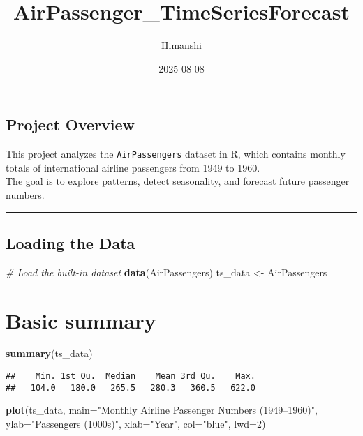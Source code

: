 \documentclass[
]{article}
\title{AirPassenger\_TimeSeriesForecast}
\author{Himanshi}
\date{2025-08-08}
\newenvironment{Shaded}{\begin{snugshade}}{\end{snugshade}}
\newcommand{\AttributeTok}[1]{\textcolor[rgb]{0.13,0.29,0.53}{#1}}
\newcommand{\CommentTok}[1]{\textcolor[rgb]{0.56,0.35,0.01}{\textit{#1}}}
\newcommand{\DecValTok}[1]{\textcolor[rgb]{0.00,0.00,0.81}{#1}}
\newcommand{\FunctionTok}[1]{\textcolor[rgb]{0.13,0.29,0.53}{\textbf{#1}}}
\newcommand{\NormalTok}[1]{#1}
\newcommand{\OtherTok}[1]{\textcolor[rgb]{0.56,0.35,0.01}{#1}}
\newcommand{\StringTok}[1]{\textcolor[rgb]{0.31,0.60,0.02}{#1}}
\begin{document}
\maketitle

\subsection{Project Overview}\label{project-overview}

This project analyzes the \texttt{AirPassengers} dataset in R, which
contains monthly totals of international airline passengers from 1949 to
1960.\\
The goal is to explore patterns, detect seasonality, and forecast future
passenger numbers.

\begin{center}\rule{0.5\linewidth}{0.5pt}\end{center}

\subsection{Loading the Data}\label{loading-the-data}

\begin{Shaded}
\begin{Highlighting}[]
\CommentTok{\# Load the built{-}in dataset}
\FunctionTok{data}\NormalTok{(AirPassengers)}
\NormalTok{ts\_data }\OtherTok{\textless{}{-}}\NormalTok{ AirPassengers}
\end{Highlighting}
\end{Shaded}

\section{Basic summary}\label{basic-summary}

\begin{Shaded}
\begin{Highlighting}[]
\FunctionTok{summary}\NormalTok{(ts\_data)}
\end{Highlighting}
\end{Shaded}

\begin{verbatim}
##    Min. 1st Qu.  Median    Mean 3rd Qu.    Max. 
##   104.0   180.0   265.5   280.3   360.5   622.0
\end{verbatim}

\begin{Shaded}
\begin{Highlighting}[]
\FunctionTok{plot}\NormalTok{(ts\_data,}
     \AttributeTok{main=}\StringTok{"Monthly Airline Passenger Numbers (1949–1960)"}\NormalTok{,}
     \AttributeTok{ylab=}\StringTok{"Passengers (1000s)"}\NormalTok{,}
     \AttributeTok{xlab=}\StringTok{"Year"}\NormalTok{,}
     \AttributeTok{col=}\StringTok{"blue"}\NormalTok{,}
     \AttributeTok{lwd=}\DecValTok{2}\NormalTok{)}
\end{Highlighting}
\end{Shaded}
\end{document}
